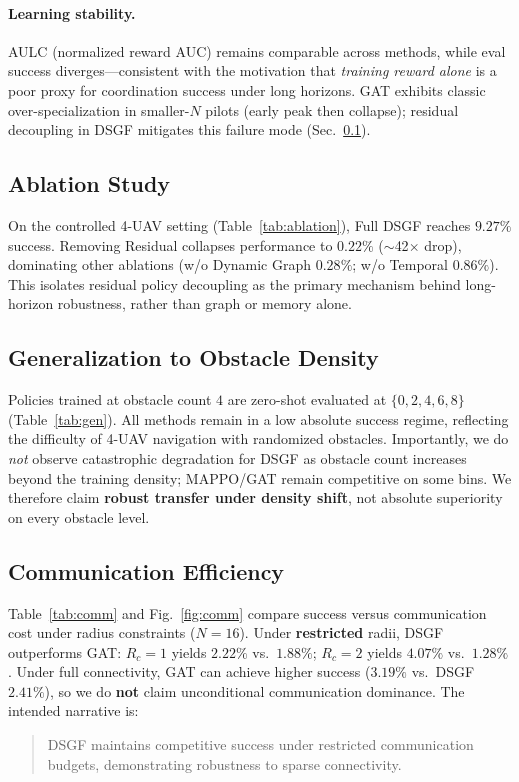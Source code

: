 
\paragraph{Learning stability.}
AULC (normalized reward AUC) remains comparable across methods, while eval
success diverges---consistent with the motivation that \emph{training reward
alone} is a poor proxy for coordination success under long horizons.
GAT exhibits classic over-specialization in smaller-$N$ pilots
(early peak then collapse); residual decoupling in DSGF mitigates this failure
mode (Sec.~\ref{sec:ablation-results}).

\subsection{Ablation Study}
\label{sec:ablation-results}
On the controlled 4-UAV setting (Table~\ref{tab:ablation}), Full DSGF reaches
$9.27\%$ success.
Removing Residual collapses performance to $0.22\%$ ($\sim$42$\times$ drop),
dominating other ablations (w/o Dynamic Graph $0.28\%$; w/o Temporal $0.86\%$).
This isolates residual policy decoupling as the primary mechanism behind
long-horizon robustness, rather than graph or memory alone.

\subsection{Generalization to Obstacle Density}
\label{sec:gen-results}
Policies trained at obstacle count $4$ are zero-shot evaluated at
$\{0,2,4,6,8\}$ (Table~\ref{tab:gen}).
All methods remain in a low absolute success regime, reflecting the difficulty
of 4-UAV navigation with randomized obstacles.
Importantly, we do \emph{not} observe catastrophic degradation for DSGF as
obstacle count increases beyond the training density; MAPPO/GAT remain
competitive on some bins.
We therefore claim \textbf{robust transfer under density shift}, not absolute
superiority on every obstacle level.

\subsection{Communication Efficiency}
\label{sec:comm-results}
Table~\ref{tab:comm} and Fig.~\ref{fig:comm} compare success versus communication
cost under radius constraints ($N{=}16$).
Under \textbf{restricted} radii, DSGF outperforms GAT:
$R_c{=}1$ yields $2.22\%$ vs.\ $1.88\%$;
$R_c{=}2$ yields $4.07\%$ vs.\ $1.28\%$.
Under full connectivity, GAT can achieve higher success ($3.19\%$ vs.\ DSGF
$2.41\%$), so we do \textbf{not} claim unconditional communication dominance.
The intended narrative is:
\begin{quote}
DSGF maintains competitive success under restricted communication budgets,
demonstrating robustness to sparse connectivity.
\end{quote}

